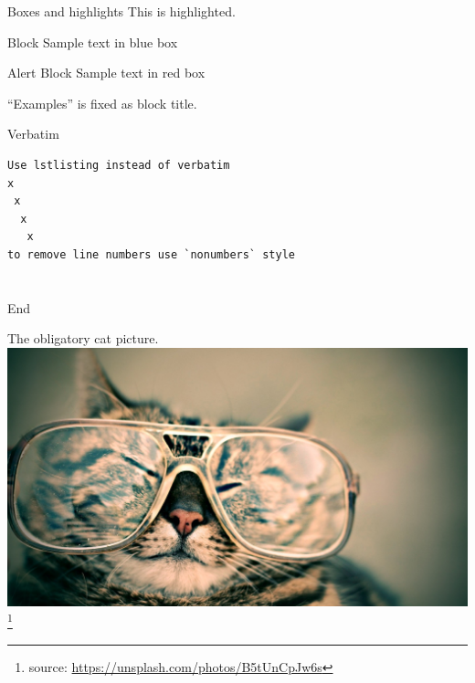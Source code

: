 \begin{frame}{Boxes and highlights}
This is \alert{highlighted}.
\begin{block}{Block}
Sample text in blue box
\end{block}
\begin{alertblock}{Alert Block}
Sample text in red box
\end{alertblock}
\begin{examples}
``Examples'' is fixed as block title.
\end{examples}
\end{frame}

\begin{frame}[fragile]{Verbatim}
\begin{lstlisting}[style=nonumbers]
Use lstlisting instead of verbatim
x
 x
  x
   x
to remove line numbers use `nonumbers` style
\end{lstlisting}
\end{frame}

\part{} %
\begin{frame}{End}
  \begin{center}
    The obligatory cat picture.
    \includegraphics[height=.7\textheight]{images/octavio-fossatti-37556.eps}
    \footnote[frame]{source:
    \href{https://unsplash.com/photos/B5tUnCpJw6s}
    {https://unsplash.com/photos/B5tUnCpJw6s}}
  \end{center}
\end{frame}


\appendix

